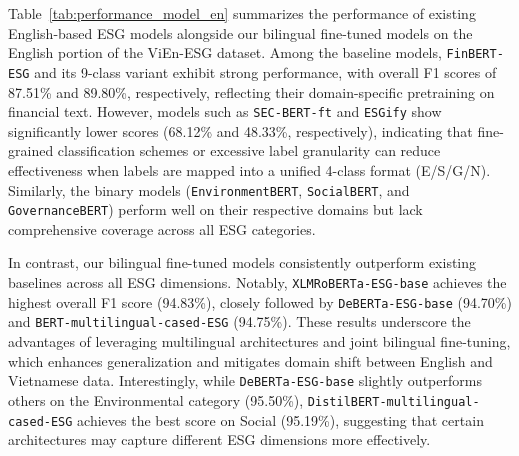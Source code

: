 \documentclass[12pt, letterpaper]{template}
\begin{document}
{{{Table~\ref{tab:performance_model_en} summarizes the performance of existing English-based ESG models alongside our bilingual fine-tuned models on the English portion of the ViEn-ESG dataset. Among the baseline models, \texttt{FinBERT-ESG} and its 9-class variant exhibit strong performance, with overall F1 scores of 87.51\% and 89.80\%, respectively, reflecting their domain-specific pretraining on financial text. However, models such as \texttt{SEC-BERT-ft} and \texttt{ESGify} show significantly lower scores (68.12\% and 48.33\%, respectively), indicating that fine-grained classification schemes or excessive label granularity can reduce effectiveness when labels are mapped into a unified 4-class format (E/S/G/N). Similarly, the binary models (\texttt{EnvironmentBERT}, \texttt{SocialBERT}, and \texttt{GovernanceBERT}) perform well on their respective domains but lack comprehensive coverage across all ESG categories.

In contrast, our bilingual fine-tuned models consistently outperform existing baselines across all ESG dimensions. Notably, \texttt{XLMRoBERTa-ESG-base} achieves the highest overall F1 score (94.83\%), closely followed by \texttt{DeBERTa-ESG-base} (94.70\%) and \texttt{BERT-multilingual-cased-ESG} (94.75\%). These results underscore the advantages of leveraging multilingual architectures and joint bilingual fine-tuning, which enhances generalization and mitigates domain shift between English and Vietnamese data. Interestingly, while \texttt{DeBERTa-ESG-base} slightly outperforms others on the Environmental category (95.50\%), \texttt{DistilBERT-multilingual-cased-ESG} achieves the best score on Social (95.19\%), suggesting that certain architectures may capture different ESG dimensions more effectively.

}}}
\end{document}
